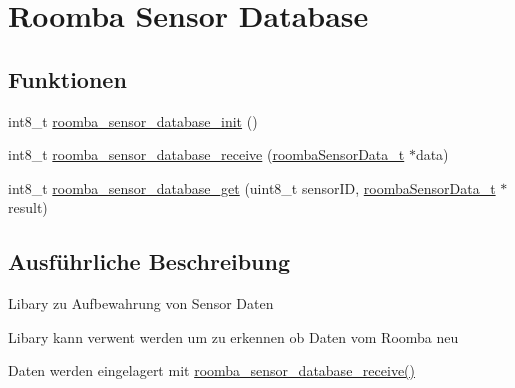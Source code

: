 \hypertarget{group__roomba__sensor__database}{\section{Roomba Sensor Database}
\label{group__roomba__sensor__database}
}
\subsection*{Funktionen}
\begin{DoxyCompactItemize}
\item 
int8\-\_\-t \hyperlink{group__roomba__sensor__database_ga38f401da93f855f73927596759aa5a33}{roomba\-\_\-sensor\-\_\-database\-\_\-init} ()
\item 
int8\-\_\-t \hyperlink{group__roomba__sensor__database_ga2ea066a1596a37271bead3cac5f74ab7}{roomba\-\_\-sensor\-\_\-database\-\_\-receive} (\hyperlink{group__roomba__def_gab15b5566c76fa573575afaccd593e86a}{roomba\-Sensor\-Data\-\_\-t} $\ast$data)
\item 
int8\-\_\-t \hyperlink{group__roomba__sensor__database_ga08fd92fbf686fe4b0ed2c8a0f47240f7}{roomba\-\_\-sensor\-\_\-database\-\_\-get} (uint8\-\_\-t sensor\-I\-D, \hyperlink{group__roomba__def_gab15b5566c76fa573575afaccd593e86a}{roomba\-Sensor\-Data\-\_\-t} $\ast$result)
\end{DoxyCompactItemize}


\subsection{Ausführliche Beschreibung}
Libary zu Aufbewahrung von Sensor Daten

Libary kann verwent werden um zu erkennen ob Daten vom Roomba neu

Daten werden eingelagert mit \hyperlink{group__roomba__sensor__database_ga2ea066a1596a37271bead3cac5f74ab7}{roomba\-\_\-sensor\-\_\-database\-\_\-receive()} 

